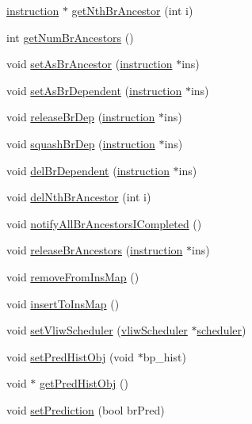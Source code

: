 \begin{DoxyCompactItemize}
\hyperlink{classinstruction}{instruction} $\ast$ \hyperlink{classinstruction_a3956b91225afe4381adb46e8630df104}{getNthBrAncestor} (int i)
\item 
int \hyperlink{classinstruction_aea5ab3c5f62740194e3bc9d3335676a2}{getNumBrAncestors} ()
\item 
void \hyperlink{classinstruction_a508aeb795698276978932acb2d81cfe2}{setAsBrAncestor} (\hyperlink{classinstruction}{instruction} $\ast$ins)
\item 
void \hyperlink{classinstruction_af3e4f5b3744955fa671e22f75da8b0a5}{setAsBrDependent} (\hyperlink{classinstruction}{instruction} $\ast$ins)
\item 
void \hyperlink{classinstruction_a8a4fb5b938939b6988c7d76a1808ef0c}{releaseBrDep} (\hyperlink{classinstruction}{instruction} $\ast$ins)
\item 
void \hyperlink{classinstruction_ad515289a10c6e269fda95c07dd7112bb}{squashBrDep} (\hyperlink{classinstruction}{instruction} $\ast$ins)
\item 
void \hyperlink{classinstruction_acf0ac8f3266fa128a76b3b287e2d305d}{delBrDependent} (\hyperlink{classinstruction}{instruction} $\ast$ins)
\item 
void \hyperlink{classinstruction_a335a34cb7652d3f3c6f63c011dd10185}{delNthBrAncestor} (int i)
\item 
void \hyperlink{classinstruction_a004b3ed6bdd168e05d4deb6d9dcb6080}{notifyAllBrAncestorsICompleted} ()
\item 
void \hyperlink{classinstruction_a3ad24eb0105af8c9f593642c3961236f}{releaseBrAncestors} (\hyperlink{classinstruction}{instruction} $\ast$ins)
\item 
void \hyperlink{classinstruction_a435d34db2d195bc1a3c451f0132151c1}{removeFromInsMap} ()
\item 
void \hyperlink{classinstruction_afb7103d520a07bdd63d69f5d36d04c38}{insertToInsMap} ()
\item 
void \hyperlink{classinstruction_ab2079e0fa9269a24ae4597eaaad67918}{setVliwScheduler} (\hyperlink{classvliwScheduler}{vliwScheduler} $\ast$\hyperlink{classscheduler}{scheduler})
\item 
void \hyperlink{classinstruction_a71e3f3ce675bfada57fa6ece90336880}{setPredHistObj} (void $\ast$bp\_\-hist)
\item 
void $\ast$ \hyperlink{classinstruction_ab78ac4674a2ff497fe482cbbac926ca9}{getPredHistObj} ()
\item 
void \hyperlink{classinstruction_afc0e97320e3110a0c3870f4537b913fe}{setPrediction} (bool brPred)

\end{DoxyCompactItemize}

